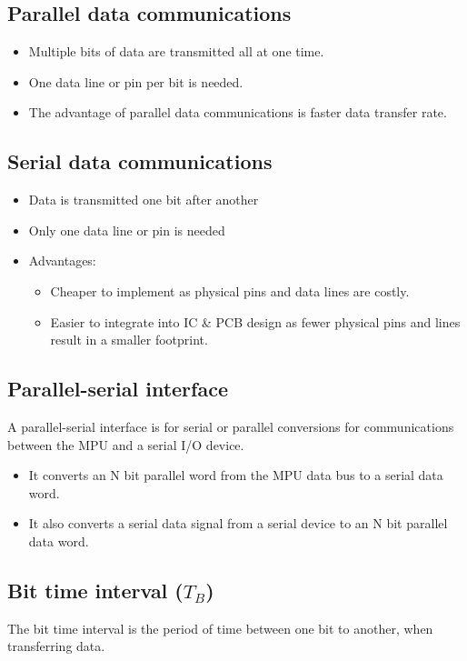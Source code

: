 \documentclass[11pt]{article}
\begin{document}
\subsection{Parallel data communications}
\label{sec:orgc173350}
\begin{itemize}
\item Multiple bits of data are transmitted all at one time.
\item One data line or pin per bit is needed.
\item The advantage of parallel data communications is faster data transfer rate.
\end{itemize}
\subsection{Serial data communications}
\label{sec:org7b237cb}
\begin{itemize}
\item Data is transmitted one bit after another
\item Only one data line or pin is needed
\item Advantages:
\begin{itemize}
\item Cheaper to implement as physical pins and data lines are costly.
\item Easier to integrate into IC \& PCB design as fewer physical pins and lines result in a smaller footprint.
\end{itemize}
\end{itemize}
\subsection{Parallel-serial interface}
\label{sec:org5213cf5}
A parallel-serial interface is for serial or parallel conversions for communications between the MPU and a serial I/O device.
\begin{itemize}
\item It converts an N bit parallel word from the MPU data bus to a serial data word.
\item It also converts a serial data signal from a serial device to an N bit parallel data word.
\end{itemize}
\subsection{Bit time interval (\(T_B\))}
\label{sec:org03a74bd}
The bit time interval is the period of time between one bit to another, when transferring data.
\end{document}
